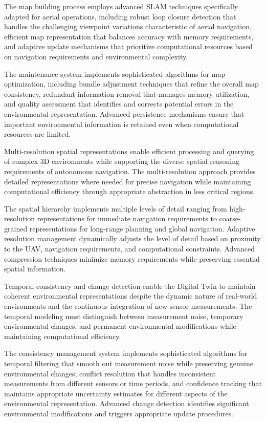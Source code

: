The map building process employs advanced SLAM techniques specifically adapted for aerial operations, including robust loop closure detection that handles the challenging viewpoint variations characteristic of aerial navigation, efficient map representation that balances accuracy with memory requirements, and adaptive update mechanisms that prioritize computational resources based on navigation requirements and environmental complexity.

The maintenance system implements sophisticated algorithms for map optimization, including bundle adjustment techniques that refine the overall map consistency, redundant information removal that manages memory utilization, and quality assessment that identifies and corrects potential errors in the environmental representation. Advanced persistence mechanisms ensure that important environmental information is retained even when computational resources are limited.

Multi-resolution spatial representations enable efficient processing and querying of complex 3D environments while supporting the diverse spatial reasoning requirements of autonomous navigation. The multi-resolution approach provides detailed representations where needed for precise navigation while maintaining computational efficiency through appropriate abstraction in less critical regions.

The spatial hierarchy implements multiple levels of detail ranging from high-resolution representations for immediate navigation requirements to coarse-grained representations for long-range planning and global navigation. Adaptive resolution management dynamically adjusts the level of detail based on proximity to the UAV, navigation requirements, and computational constraints. Advanced compression techniques minimize memory requirements while preserving essential spatial information.

Temporal consistency and change detection enable the Digital Twin to maintain coherent environmental representations despite the dynamic nature of real-world environments and the continuous integration of new sensor measurements. The temporal modeling must distinguish between measurement noise, temporary environmental changes, and permanent environmental modifications while maintaining computational efficiency.

The consistency management system implements sophisticated algorithms for temporal filtering that smooth out measurement noise while preserving genuine environmental changes, conflict resolution that handles inconsistent measurements from different sensors or time periods, and confidence tracking that maintains appropriate uncertainty estimates for different aspects of the environmental representation. Advanced change detection identifies significant environmental modifications and triggers appropriate update procedures.

